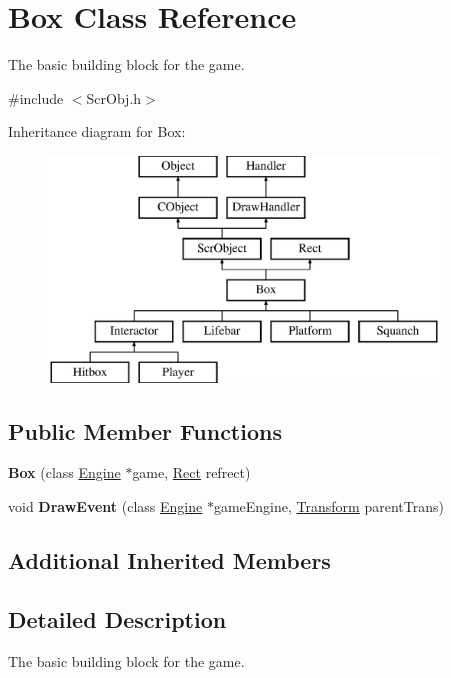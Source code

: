 \hypertarget{class_box}{}\section{Box Class Reference}
\label{class_box}


The basic building block for the game.  




{\ttfamily \#include $<$Scr\+Obj.\+h$>$}

Inheritance diagram for Box\+:\begin{figure}[H]
\begin{center}
\leavevmode
\includegraphics[height=6.000000cm]{class_box}
\end{center}
\end{figure}
\subsection*{Public Member Functions}
\begin{DoxyCompactItemize}
\item 
\hypertarget{class_box_a1a76055740b6ae3061ae210cd55785b7}{}\label{class_box_a1a76055740b6ae3061ae210cd55785b7} 
{\bfseries Box} (class \hyperlink{class_engine}{Engine} $\ast$game, \hyperlink{class_rect}{Rect} refrect)
\item 
\hypertarget{class_box_a97fa7330aafa9f4cafe300cbf3436d04}{}\label{class_box_a97fa7330aafa9f4cafe300cbf3436d04} 
void {\bfseries Draw\+Event} (class \hyperlink{class_engine}{Engine} $\ast$game\+Engine, \hyperlink{class_transform}{Transform} parent\+Trans)
\end{DoxyCompactItemize}
\subsection*{Additional Inherited Members}


\subsection{Detailed Description}
The basic building block for the game. 

